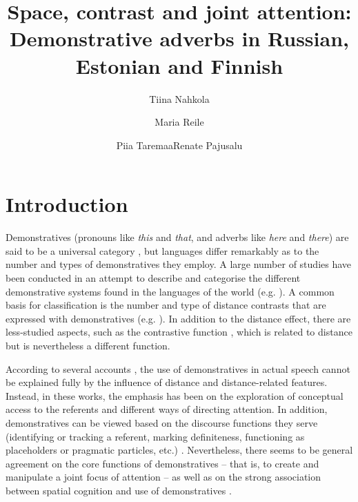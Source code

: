 \documentclass[output=paper,colorlinks,citecolor=brown]{langscibook}
\author{Tiina Nahkola\and Maria Reile\and Piia Taremaa\lastand Renate Pajusalu\affiliation{University of Tartu}}
\title{Space, contrast and joint attention: Demonstrative adverbs in Russian, Estonian and Finnish}
\begin{document}
\maketitle 
{}


\section{Introduction}\label{sec:nahkola:1}

Demonstratives (pronouns like \textit{this} and \textit{that}, and adverbs like \textit{here} and \textit{there}) are said to be a universal category \citep{Diessel1999Book,Diessel2006,Dixon2003}, but languages differ remarkably as to the number and types of demonstratives they employ. A large number of studies have been conducted in an attempt to describe and categorise the different demonstrative systems found in the languages of the world (e.g. \citealt{Diessel1999Book,Kibrik2011}). A common basis for classification is the number and type of distance contrasts that are expressed with demonstratives (e.g. \citealt{AndersonKeenan1985,Diessel2013}). In addition to the distance effect, there are less-studied aspects, such as the contrastive function \citep{MeiraTerrill2005}, which is related to distance but is nevertheless a different function.

According to several accounts \citep{Hanks1992,Hanks2011,Enfield2003,Ariel2013}, the use of demonstratives in actual speech cannot be explained fully by the influence of distance and distance-related features. Instead, in these works, the emphasis has been on the exploration of conceptual access to the referents and different ways of directing attention. In addition, demonstratives can be viewed based on the discourse functions they serve (identifying or tracking a referent, marking definiteness, functioning as placeholders or pragmatic particles, etc.) \citep{Himmelmann1996,Diessel1999Book,Diessel2006}. Nevertheless, there seems to be general agreement on the core functions of demonstratives – that is, to create and manipulate a joint focus of attention \citep{Diessel2006} – as well as on the strong association between spatial cognition and use of demonstratives \citep{CoventryEtAl2008,GuddeEtAl2016}.
\end{document}
